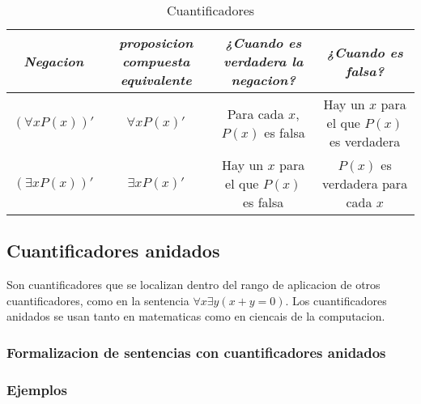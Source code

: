 \documentclass[]{article}
\begin{document}
\begin{table}[H]
	\caption*{Cuantificadores}
	\begin{center}
		\begin{tabular}{|c|c|c|c|}
			\hline
			\textit{Negacion} & \textit{proposicion compuesta equivalente} & \textit{¿Cuando es verdadera la negacion?} & \textit{¿Cuando es falsa?}\\
			\hline
			$(\forall x P(x))'$ & $\forall x P(x)'$ & Para cada $x$, $P(x)$ es falsa & Hay un $x$ para el que $P(x)$ es verdadera\\
			\hline
			$(\exists x P(x))'$ & $\exists x P(x)'$ & Hay un $x$ para el que $P(x)$ es falsa & $P(x)$ es verdadera para cada $x$\\
			\hline
		\end{tabular}
	\end{center}
\end{table}

\subsection{Cuantificadores anidados}

Son cuantificadores que se localizan dentro del rango de aplicacion de otros cuantificadores, como en la sentencia $\forall x \exists y (x + y = 0)$. Los cuantificadores anidados se usan tanto en matematicas como en ciencais de la computacion. 

\subsubsection*{Formalizacion de sentencias con cuantificadores anidados}

\subsubsection*{Ejemplos}
\end{document}
